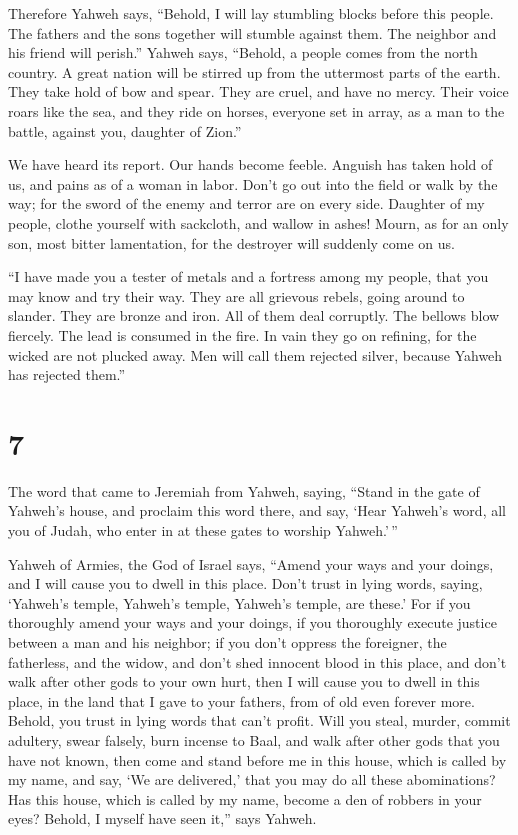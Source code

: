  Therefore Yahweh says, ``Behold, I will lay stumbling
blocks before this people. The fathers and the sons together will
stumble against them. The neighbor and his friend will perish.''
 Yahweh says, ``Behold, a people comes from the north
country. A great nation will be stirred up from the uttermost parts of
the earth.  They take hold of bow and spear. They are
cruel, and have no mercy. Their voice roars like the sea, and they ride
on horses, everyone set in array, as a man to the battle, against you,
daughter of Zion.''

 We have heard its report. Our hands become feeble. Anguish
has taken hold of us, and pains as of a woman in labor. 
Don't go out into the field or walk by the way; for the sword of the
enemy and terror are on every side.  Daughter of my people,
clothe yourself with sackcloth, and wallow in ashes! Mourn, as for an
only son, most bitter lamentation, for the destroyer will suddenly come
on us.

 ``I have made you a tester of metals and a fortress among
my people, that you may know and try their way.  They are
all grievous rebels, going around to slander. They are bronze and iron.
All of them deal corruptly.  The bellows blow fiercely. The
lead is consumed in the fire. In vain they go on refining, for the
wicked are not plucked away.  Men will call them rejected
silver, because Yahweh has rejected them.''

\hypertarget{section-6}{%
\section{7}\label{section-6}}

 The word that came to Jeremiah from Yahweh, saying,
 ``Stand in the gate of Yahweh's house, and proclaim this
word there, and say, `Hear Yahweh's word, all you of Judah, who enter in
at these gates to worship Yahweh.'\,''

 Yahweh of Armies, the God of Israel says, ``Amend your ways
and your doings, and I will cause you to dwell in this place.
 Don't trust in lying words, saying, `Yahweh's temple,
Yahweh's temple, Yahweh's temple, are these.'  For if you
thoroughly amend your ways and your doings, if you thoroughly execute
justice between a man and his neighbor;  if you don't
oppress the foreigner, the fatherless, and the widow, and don't shed
innocent blood in this place, and don't walk after other gods to your
own hurt,  then I will cause you to dwell in this place, in
the land that I gave to your fathers, from of old even forever more.
 Behold, you trust in lying words that can't profit.
 Will you steal, murder, commit adultery, swear falsely,
burn incense to Baal, and walk after other gods that you have not known,
 then come and stand before me in this house, which is
called by my name, and say, `We are delivered,' that you may do all
these abominations?  Has this house, which is called by my
name, become a den of robbers in your eyes? Behold, I myself have seen
it,'' says Yahweh.


